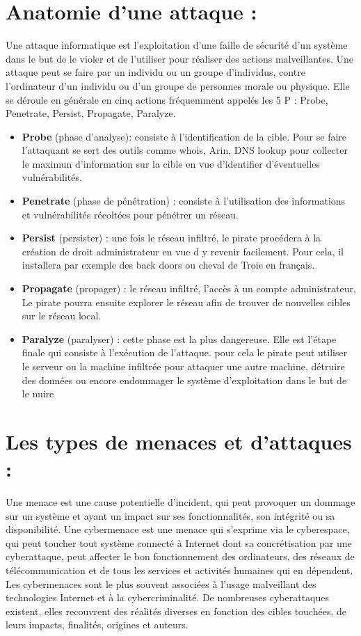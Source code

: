 \section{Anatomie d'une attaque :}
Une attaque informatique est l'exploitation d'une faille de sécurité d'un système dans le but de le violer et de l'utiliser pour réaliser des actions malveillantes. Une attaque peut se faire par un individu ou un groupe d'individus, contre l'ordinateur d'un individu ou d'un groupe de personnes morale ou physique. Elle se déroule en générale en cinq actions fréquemment appelés les 5 P  \cite{ref5p} : Probe, Penetrate, Persist, Propagate, Paralyze.
\begin{itemize}
\item\textbf{Probe} (phase d'analyse): consiste à l'identification de la cible. Pour se faire l'attaquant se sert des outils comme whois, Arin, DNS lookup pour collecter le maximun d'information sur la cible en vue d'identifier d'éventuelles vulnérabilités.
\item\textbf{Penetrate} (phase de pénétration) : consiste à l'utilisation des informations et vulnérabilités récoltées pour pénétrer un réseau.
\item\textbf{Persist} (persister) : une fois le réseau infiltré, le pirate procédera à la création de droit administrateur en vue d y revenir facilement. Pour cela, il installera par exemple des back doors ou cheval de Troie en français.
\item\textbf{Propagate} (propager) : le réseau  infiltré, l'accès à un compte administrateur, Le pirate pourra ensuite  explorer le réseau afin de trouver de nouvelles cibles sur le réseau local. 
\item\textbf{Paralyze} (paralyser) : cette phase est la plus dangereuse. Elle est l'étape finale qui consiste à l'exécution  de l'attaque. pour cela le pirate peut utiliser le serveur ou la machine infiltrée pour attaquer une autre machine, détruire des données ou encore endommager le système d’exploitation dans le but de le nuire
\end{itemize}
\section{Les types de menaces et d’attaques : }
Une menace est une cause potentielle d’incident, qui peut provoquer un dommage sur un système et ayant un impact sur ses fonctionnalités, son intégrité ou sa disponibilité. Une cybermenace est une menace qui s’exprime via le cyberespace, qui peut toucher tout système connecté à Internet dont sa concrétisation par une cyberattaque, peut affecter le bon fonctionnement des ordinateurs, des réseaux de télécommunication et de tous les services et activités humaines qui en dépendent\cite{cybermenace}. Les cybermenaces sont le plus souvent associées à l’usage malveillant des technologies Internet et à la cybercriminalité. De nombreuses cyberattaques existent, elles recouvrent des réalités diverses en fonction des cibles touchées, de leurs impacts, finalités, origines et auteurs.
